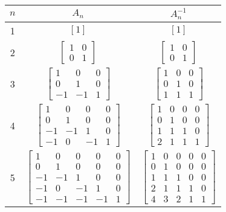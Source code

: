 \documentclass[12pt,reqno,a4letter]{article}
\numberwithin{figure}{section}
\numberwithin{table}{section}
\numberwithin{equation}{section}
\theoremstyle{plain}
\numberwithin{theorem}{section}
\theoremstyle{definition}
\begin{document}
\begin{table}[h!]

\begin{center}
     \begin{tabular}{||c||c|c||} \hline\hline
$n$ & $A_n$ & $A_n^{-1}$ \\ \hline 
1 & $[1]$ & $[1]$ \\ 
2 & $\begin{bmatrix} 1 & 0 \\ 0 & 1 \end{bmatrix}$ & 
    $\begin{bmatrix} 1 & 0 \\ 0 & 1 \end{bmatrix}$ \\ 
3 & $\begin{bmatrix} 1 & 0 & 0 \\ 0 & 1 & 0 \\ -1 & -1 & 1 \end{bmatrix}$ & 
    $\begin{bmatrix} 1 & 0 & 0 \\ 0 & 1 & 0 \\ 1 & 1 & 1 \end{bmatrix}$ \\ 
4 & $\begin{bmatrix} 1 & 0 & 0 & 0 \\ 0 & 1 & 0 & 0 \\ -1 & -1 & 1 & 0 \\ 
                     -1 & 0 & -1 & 1 \end{bmatrix}$ & 
    $\begin{bmatrix} 1 & 0 & 0 & 0 \\ 0 & 1 & 0 & 0 \\ 1 & 1 & 1 & 0 \\ 
                     2 & 1 & 1 & 1 \end{bmatrix}$ \\ 
5 & $\begin{bmatrix} 1 & 0 & 0 & 0 & 0 \\ 0 & 1 & 0 & 0 & 0 \\ 
                     -1 & -1 & 1 & 0 & 0 \\ -1 & 0 & -1 & 1 & 0 \\ 
                     -1 & -1 & -1 & -1 & 1 \end{bmatrix}$ & 
    $\begin{bmatrix} 1 & 0 & 0 & 0 & 0 \\ 0 & 1 & 0 & 0 & 0 \\ 
                     1 & 1 & 1 & 0 & 0 \\ 2 & 1 & 1 & 1 & 0 \\ 
                     4 & 3 & 2 & 1 & 1 \end{bmatrix}$ \\ 
\hline\hline
\end{tabular} 
\end{center} 

\caption[LGF factorization matrices]{}
\label{table_LGF_AnAnInve_MatrixExamples_v1}

\end{table}
\end{document}
